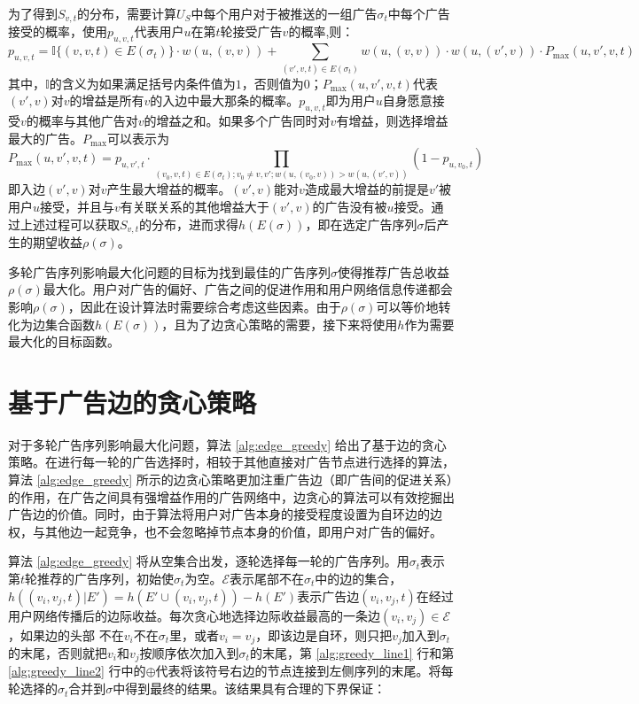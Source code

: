 为了得到$S_{v,t}$的分布，需要计算$U_S$中每个用户对于被推送的一组广告$\sigma_t$中每个广告接受的概率，使用$p_{u,v,t}$代表用户$u$在第$t$轮接受广告$v$的概率,则\label{sec:puvt}：
\begin{equation}
p_{u,v,t}=\mathbb{I}\{(v,v,t)\in E(\sigma_t)\}\cdot w(u,(v,v)) + \sum_{(v',v,t)\in E(\sigma_t)}w(u,(v,v))\cdot w(u,(v',v))\cdot P_{\max}(u,v',v,t)
\end{equation}
\noindent 其中，$\mathbb{I}$的含义为如果满足括号内条件值为$1$，否则值为$0$；$P_{\max}(u,v',v,t)$代表$(v',v)$对$v$的增益是所有$v$的入边中最大那条的概率。$p_{u,v,t}$即为用户$u$自身愿意接受$v$的概率与其他广告对$v$的增益之和。如果多个广告同时对$v$有增益，则选择增益最大的广告。$P_{\max}$可以表示为
\begin{equation}
    P_{\max}(u,v',v,t)=p_{u,v',t}\cdot \prod_{(v_0,v,t)\in E(\sigma_t);v_0\neq v,v';w(u,(v_0,v))>w(u,(v',v))}(1-p_{u,v_0,t})
\end{equation}
\noindent 即入边$(v',v)$对$v$产生最大增益的概率。$(v',v)$能对$v$造成最大增益的前提是$v'$被用户$u$接受，并且与$v$有关联关系的其他增益大于$(v',v)$的广告没有被$u$接受。通过上述过程可以获取$S_{v,t}$的分布，进而求得$h(E(\sigma))$，即在选定广告序列$\sigma$后产生的期望收益$\rho(\sigma)$。

多轮广告序列影响最大化问题的目标为找到最佳的广告序列$\sigma$使得推荐广告总收益$\rho(\sigma)$最大化。用户对广告的偏好、广告之间的促进作用和用户网络信息传递都会影响$\rho(\sigma)$，因此在设计算法时需要综合考虑这些因素。由于$\rho(\sigma)$可以等价地转化为边集合函数$h(E(\sigma))$，且为了边贪心策略的需要，接下来将使用$h$作为需要最大化的目标函数。

\section{基于广告边的贪心策略}
\label{sec:greedy}
对于多轮广告序列影响最大化问题，算法 \ref{alg:edge_greedy} 给出了基于边的贪心策略。在进行每一轮的广告选择时，相较于其他直接对广告节点进行选择的算法\cite{kempe2008ad1,tang2017robust,tang2018social}，算法 \ref{alg:edge_greedy} 所示的边贪心策略更加注重广告边（即广告间的促进关系）的作用，在广告之间具有强增益作用的广告网络中，边贪心的算法可以有效挖掘出广告边的价值。同时，由于算法将用户对广告本身的接受程度设置为自环边的边权，与其他边一起竞争，也不会忽略掉节点本身的价值，即用户对广告的偏好。

算法 \ref{alg:edge_greedy} 将从空集合出发，逐轮选择每一轮的广告序列。用$\sigma_t$表示第$t$轮推荐的广告序列，初始使$\sigma_t$为空。$\mathcal{E}$表示尾部不在$\sigma_t$中的边的集合，$h((v_i,v_j,t)|E')=h(E'\cup{(v_i,v_j,t)})-h(E')$表示广告边$(v_i,v_j,t)$在经过用户网络传播后的边际收益。每次贪心地选择边际收益最高的一条边$(v_i,v_j)\in \mathcal{E}$，如果边的头部 不在$v_i$不在$\sigma_t$里，或者$v_i=v_j$，即该边是自环，则只把$v_j$加入到$\sigma_t$的末尾，否则就把$v_i$和$v_j$按顺序依次加入到$\sigma_t$的末尾，第 \ref{alg:greedy_line1} 行和第 \ref{alg:greedy_line2} 行中的$\oplus$代表将该符号右边的节点连接到左侧序列的末尾。将每轮选择的$\sigma_t$合并到$\sigma$中得到最终的结果。该结果具有合理的下界保证：

